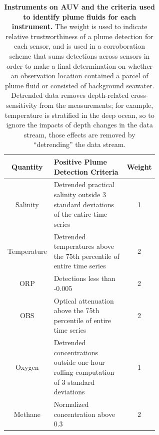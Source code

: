 \begin{table}[h!]
    \centering
    \begin{tabular}{c|p{0.6\linewidth}|c}
        Quantity & Positive Plume Detection Criteria & Weight  \\
        \hline
        Salinity & Detrended practical salinity outside 3 standard deviations of the entire time series & 1 \\
        Temperature & Detrended temperatures above the 75th percentile of entire time series & 2 \\
        ORP & Detections less than -0.005 & 2 \\
        OBS & Optical attenuation above the 75th percentile of entire time series & 2 \\
        Oxygen & Detrended concentrations outside one-hour rolling computation of 3 standard deviations & 1 \\
        Methane & Normalized concentration above 0.3 & 2
    \end{tabular}
    \caption{\textbf{Instruments on AUV \Sentry and the criteria used to identify plume fluids for each instrument.} The weight is used to indicate relative trustworthiness of a plume detection for each sensor, and is used in a corroboration scheme that sums detections across sensors in order to make a final determination on whether an observation location contained a parcel of plume fluid or consisted of background seawater. Detrended data removes depth-related cross-sensitivity from the measurements; for example, temperature is stratified in the deep ocean, so to ignore the impacts of depth changes in the data stream, those effects are removed by ``detrending'' the data stream.}
    \label{tab:sentry_instruments}
\end{table}

